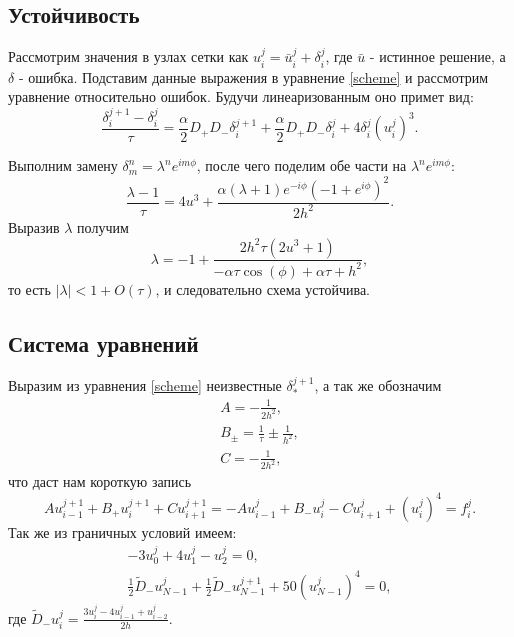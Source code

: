 \documentclass[a4paper,12pt]{article}
\begin{document}
\subsection*{Устойчивость}

Рассмотрим значения в узлах сетки как \(u_{i}^{j} = \bar{u}_{i}^{j} + \delta_{i}^{j}\), где \(\bar{u}\) - истинное решение, а \(\delta\) - ошибка. Подставим данные выражения в уравнение \cref{scheme} и рассмотрим уравнение относительно ошибок. Будучи линеаризованным оно примет вид:
\begin{equation*}
  \frac{\delta_{i}^{j+1}-\delta_{i}^{j}}{\tau}=\frac{\alpha}{2}D_{+}D_{-}\delta_{i}^{j+1}+\frac{\alpha}{2}D_{+}D_{-}\delta_{i}^{j} + 4\delta_{i}^{j} \left(u_{i}^{j}\right)^3.
\end{equation*}

Выполним замену \(\delta_{m}^{n}=\lambda^{n} e^{i m \phi}\), после чего поделим обе части на \(\lambda^{n} e^{i m \phi}\):
\begin{equation*}
  \frac{\lambda -1}{\tau }=4 u^3+\frac{\alpha  (\lambda +1) e^{-i \phi } \left(-1+e^{i \phi }\right)^2}{2 h^2}.
\end{equation*}
Выразив \(\lambda\) получим
\begin{equation*}
  \lambda = -1 + \frac{2 h^2 \tau \left(2 u^3+1\right)}{-\alpha  \tau  \cos (\phi )+\alpha  \tau +h^2},
\end{equation*}
то есть \(\left|\lambda\right| < 1 + O(\tau)\), и следовательно схема устойчива.

\subsection*{Система уравнений}

Выразим из уравнения \cref{scheme} неизвестные \(\delta_{*}^{j+1}\), а так же обозначим
\begin{gather*}
  A = -\frac{1}{2h^2},\\
  B_{\pm} = \frac{1}{\tau}\pm\frac{1}{h^2},\\
  C = -\frac{1}{2h^2},
\end{gather*}
что даст нам короткую запись
\begin{equation}\label{eq}
  A u_{i-1}^{j+1} + B_{+} u_{i}^{j+1} + C u_{i+1}^{j+1} = -A u_{i-1}^{j} + B_{-} u_{i}^{j} - C u_{i+1}^{j} + \left(u_{i}^{j}\right)^4 = f_{i}^{j}.
\end{equation}
Так же из граничных условий имеем:
\begin{gather}
  \label{lcond}-3 u_{0}^{j} + 4u_{1}^{j}-u_{2}^{j}=0,\\
  \label{rcond}\frac{1}{2}\tilde{D}_{-}u_{N-1}^{j} + \frac{1}{2}\tilde{D}_{-}u_{N-1}^{j+1} + 50\left(u_{N-1}^{j}\right)^4=0,
\end{gather}
где \(\tilde{D}_{-}u_{i}^{j}=\frac{3 u_{i}^{j} - 4u_{i-1}^{j}+u_{i-2}^{j}}{2h}\).
\end{document}
